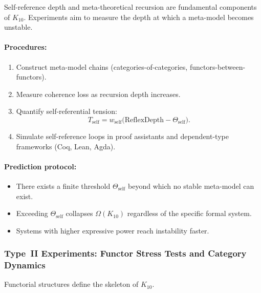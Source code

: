 Self-reference depth and meta-theoretical recursion are fundamental
components of $K_{10}$.
Experiments aim to measure the depth at which a meta-model becomes
unstable.

\paragraph{Procedures:}

\begin{enumerate}
    \item Construct meta-model chains (categories-of-categories,
          functors-between-functors).
    \item Measure coherence loss as recursion depth increases.
    \item Quantify self-referential tension:
          \[
              T_{\mathrm{self}} =
              w_{\mathrm{self}}\bigl(
                 \mathrm{ReflexDepth} - \Theta_{\mathrm{self}}
              \bigr).
          \]
    \item Simulate self-reference loops in proof assistants and
          dependent-type frameworks (Coq, Lean, Agda).
\end{enumerate}

\paragraph{Prediction protocol:}

\begin{itemize}
    \item There exists a finite threshold $\Theta_{\mathrm{self}}$ beyond
          which no stable meta-model can exist.
    \item Exceeding $\Theta_{\mathrm{self}}$ collapses
          $\Omega(K_{10})$ regardless of the specific formal system.
    \item Systems with higher expressive power reach instability faster.
\end{itemize}



\subsubsection{Type~II Experiments: Functor Stress Tests and Category Dynamics}

Functorial structures define the skeleton of $K_{10}$.

